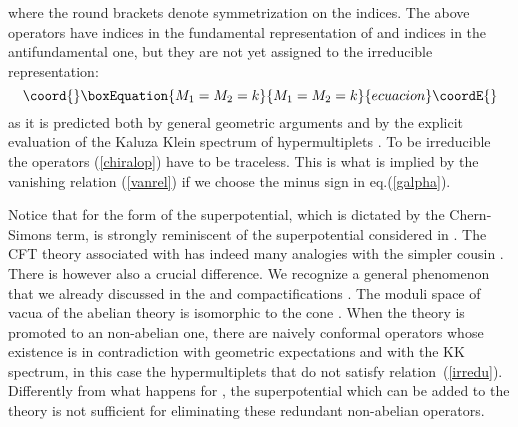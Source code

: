 \documentclass[a4paper,12pt]{article}
\def\n010{N^{0,1,0}}
\begin{document}
where the round brackets denote symmetrization on the indices.
The above operators have \coordHE{} indices in the fundamental
representation of \coordHE{} and \coordHE{} indices in the antifundamental one,
but they are not yet assigned to the irreducible representation:
\begin{equation}\coord{}\boxEquation{
  M_1=M_2 = k
\label{irredu}
}{
  M_1=M_2 = k
}{ecuacion}\coordE{}\end{equation}
as it is predicted both by general geometric arguments and by the
explicit evaluation of the Kaluza Klein spectrum of hypermultiplets
\cite{osp34}. To be irreducible the operators (\ref{chiralop}) have
to be traceless. This is what is implied by the vanishing relation
(\ref{vanrel}) if we choose the minus sign in eq.(\ref{galpha}).
\par
Notice that for \coordHE{} the form of the superpotential, which is
dictated by the Chern-Simons term, is strongly reminiscent of the
superpotential considered in \cite{witkleb}.
The CFT theory associated with  \coordHE{} has indeed many analogies
with the simpler cousin \coordHE{}.
There is however also a crucial difference.
We recognize a general phenomenon that we already discussed in the
\coordHE{} and \coordHE{} compactifications \cite{3dcft}.
The moduli space of vacua of the abelian theory is isomorphic to the
cone \myHighlight{${\cal C}\left( \n010\right)$}\coordHE{}.
When the theory is promoted to an non-abelian one, there are naively
conformal operators whose existence is in contradiction with geometric
expectations and with the KK spectrum, in this case the hypermultiplets
that do not satisfy relation~(\ref{irredu}).
Differently from what happens for \coordHE{} \cite{witkleb},
the superpotential which can be added to the theory is not sufficient
for eliminating these redundant non-abelian operators.
\end{document}
